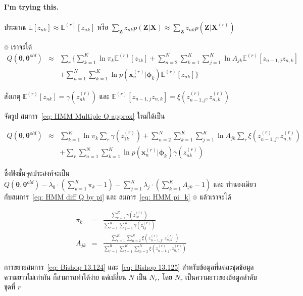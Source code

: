 \paragraph{I'm trying this.}
ประมาณ $\mathbb{E}[z_{nk}] \approx \mathbb{E}^{(r)}[z_{nk}]$ หรือ $\sum_{\textbf{Z}} z_{nk} p(\textbf{Z}|\textbf{X}) \approx \sum_{\textbf{Z}} z_{nk} p(\textbf{Z}|\textbf{X}^{(r)})$

๏ เราจะได้ 
\begin{eqnarray}
Q(\bm{\theta}, \bm{\theta}^{old})
&\approx&
\sum_r \{ \sum_{k=1}^K \ln \pi_k \mathbb{E}^{(r)} [ z_{1k} ]
+ \sum_{n=2}^N \sum_{k=1}^K \sum_{j=1}^K \ln A_{jk} \mathbb{E}^{(r)} [z_{n-1,j} z_{n,k}]  
\nonumber \\
&\;&
+ \sum_{n=1}^N \sum_{k=1}^K \ln p(\textbf{x}_n^{(r)}|\bm{\phi}_k) \mathbb{E}^{(r)} [z_{nk}] \}
\label{eq: HMM Multiple Q approx}
\end{eqnarray}

สังเกตุ $\mathbb{E}^{(r)} [z_{nk}] = \gamma(z_{nk}^{(r)})$ และ 
$\mathbb{E}^{(r)} [z_{n-1,j}  z_{n,k}] = \xi (z_{n-1,j}^{(r)}, z_{n,k}^{(r)})$

จัดรูป สมการ~\ref{eq: HMM Multiple Q approx} ใหม่ได้เป็น

\begin{eqnarray}
Q(\bm{\theta}, \bm{\theta}^{old})
&\approx&
\sum_{k=1}^K \ln \pi_k \sum_r \gamma(z_{1k}^{(r)})
+ \sum_{n=2}^N \sum_{k=1}^K \sum_{j=1}^K \ln A_{jk} \sum_r \xi (z_{n-1,j}^{(r)}, z_{n,k}^{(r)})  
\nonumber \\
&\;&
+ \sum_r \sum_{n=1}^N \sum_{k=1}^K \ln p(\textbf{x}_n^{(r)}|\bm{\phi}_k) \gamma(z_{nk}^{(r)})
\label{eq: HMM MultipleQ approx nice form}
\end{eqnarray}

ซึ่งฟังชั่นจุดประสงค์จะเป็น 
$Q(\bm{\theta},\bm{\theta}^{old}) - \lambda_0 \cdot(\sum_{k=1}^K \pi_k - 1) - \sum_{j=1}^K \lambda_j \cdot(\sum_{k=1}^K A_{jk} - 1)$
และ ทำนองเดียวกับสมการ~\ref{eq: HMM diff Q by pi} และ สมการ~\ref{eq: HMM pi_k}
๏ แล้วเราจะได้

\begin{eqnarray}
\pi_k &=& \frac{\sum_{r=1}^R \gamma(z_{1k}^{(r)})}{\sum_{r=1}^R \sum_{j=1}^K \gamma(z_{1j}^{(r)})}
\label{eq: Bishop 13.124} \\
A_{jk} &=& \frac{\sum_{r=1}^R \sum_{n=2}^N \xi (z_{n-1,j}^{(r)}, z_{n,k}^{(r)})}{\sum_{r=1}^R \sum_{l=1}^K \sum_{n=2}^N \xi (z_{n-1,j}^{(r)}, z_{n,l}^{(r)})}
\label{eq: Bishop 13.125}
\end{eqnarray}

การขยายสมการ~\ref{eq: Bishop 13.124} และ~\ref{eq: Bishop 13.125} สำหรับข้อมูลที่แต่ละชุดข้อมูลความยาวไม่เท่ากัน ก็สามารถทำได้ง่าย แค่เปลี่ยน $N$ เป็น $N_r$,
 โดย $N_r$ เป็นความยาวของข้อมูลลำดับ ชุดที่ $r$


